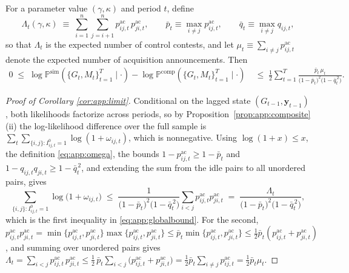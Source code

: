 \begin{corollary}%
\label{cor:app:limit}
For a parameter value $(\gamma, \kappa)$ and period $t$, define
\begin{equation}
  \Lambda_t(\gamma,\kappa)
  \;\equiv\;
  \sum_{i=1}^{n}\sum_{j=i+1}^{n}
  p^{\mathrm{ac}}_{ij,t}\, p^{\mathrm{ac}}_{ji,t},
  \qquad
  \bar{p}_t \equiv \max_{i \neq j} p^{\mathrm{ac}}_{ij,t},
  \qquad
  \bar{q}_t \equiv \max_{i \neq j} q_{ij,t},
  \label{eq:app:Lambda}
\end{equation}
so that $\Lambda_t$ is the expected number of control contests, and let
$\mu_t \equiv \sum_{i \neq j} p^{\mathrm{ac}}_{ij,t}$ denote the
expected number of acquisition announcements. Then
\begin{align}
  0
  \;\le\;
  \log \mathbb{P}^{\mathrm{sim}}(\{G_t, M_t\}_{t=1}^{T} \mid \cdot)
  -
  \log \mathbb{P}^{\mathrm{comp}}(\{G_t, M_t\}_{t=1}^{T} \mid \cdot)
  & \;\le\;
  \frac{1}{2} \sum_{t=1}^{T}
  \frac{\bar{p}_t\, \mu_t}
       {\bigl( 1 - \bar{p}_t \bigr)^2
        \bigl( 1 - \bar{q}_t^{\,2} \bigr)}.
  \label{eq:app:globalbound}
\end{align}
\end{corollary}
\begin{proof}[Proof of Corollary \ref{cor:app:limit}]
Conditional on the lagged state $(G_{t-1}, \mathbf{y}_{t-1})$, both
likelihoods factorize across periods, so by
Proposition~\ref{prop:app:composite}(ii) the log-likelihood difference
over the full sample is $\sum_{t} \sum_{\{i,j\}: I^0_{ij,t}=1} \log(1 +
\omega_{ij,t})$, which is nonnegative. Using $\log(1+x) \le x$, the
definition \eqref{eq:app:omega}, the bounds
$1 - p^{\mathrm{ac}}_{ij,t} \ge 1 - \bar{p}_t$ and $1 - q_{ij,t}
q_{ji,t} \ge 1 - \bar{q}_t^{\,2}$, and extending the sum from the idle
pairs to all unordered pairs, gives
\begin{equation*}
  \sum_{\{i,j\}: I^0_{ij,t}=1} \log \bigl( 1 + \omega_{ij,t} \bigr)
  \;\le\;
  \frac{1}{\bigl(1-\bar{p}_t\bigr)^2
  \bigl(1-\bar{q}_t^{\,2}\bigr)}
  \sum_{i<j} p^{\mathrm{ac}}_{ij,t} p^{\mathrm{ac}}_{ji,t}
  \;=\;
  \frac{\Lambda_t}{\bigl(1-\bar{p}_t\bigr)^2
  \bigl(1-\bar{q}_t^{\,2}\bigr)},
\end{equation*}
which is the first inequality in \eqref{eq:app:globalbound}. For the
second, $p^{\mathrm{ac}}_{ij,t} p^{\mathrm{ac}}_{ji,t} = \min \{ p^{\mathrm{ac}}_{ij,t}, p^{\mathrm{ac}}_{ji,t} \} \max \{ p^{\mathrm{ac}}_{ij,t}, p^{\mathrm{ac}}_{ji,t} \} \le \bar{p}_t
\min \{ p^{\mathrm{ac}}_{ij,t}, p^{\mathrm{ac}}_{ji,t} \} \le
\tfrac{1}{2} \bar{p}_t ( p^{\mathrm{ac}}_{ij,t} +
p^{\mathrm{ac}}_{ji,t} )$, and summing over unordered pairs gives
$\Lambda_t = \sum_{i<j} p^{\mathrm{ac}}_{ij,t}\, p^{\mathrm{ac}}_{ji,t} \le \tfrac{1}{2}\,\bar{p}_t \sum_{i<j}
\bigl( p^{\mathrm{ac}}_{ij,t} + p^{\mathrm{ac}}_{ji,t} \bigr) = \tfrac{1}{2} \bar{p}_t \sum_{i \neq j} p^{\mathrm{ac}}_{ij,t} = \tfrac{1}{2} \bar{p}_t \mu_t$.
\end{proof}


